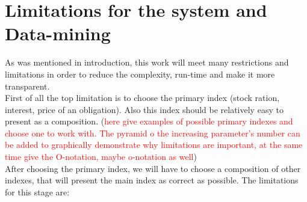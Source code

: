 \documentclass[11pt]{article}
\begin{document}
\newpage
\section{Limitations for the system and Data-mining}
As was mentioned in introduction, this work will meet many restrictions and limitations in order to reduce the complexity, run-time and make it more transparent. \\
First of all the top limitation is to choose the primary index (stock ration, interest, price of an  obligation). Also this index should be relatively easy to present as a composition. (\textcolor{red}{here give examples of possible primary indexes and choose one to work with. The pyramid o the increasing parameter's number can be added to graphically demonstrate why limitations are important, at the same time give the O-notation, maybe o-notation as well})\\
After choosing the primary index, we will have to choose a composition of other indexes, that will present the main index as correct as possible. The limitations for this stage are:
\end{document}

